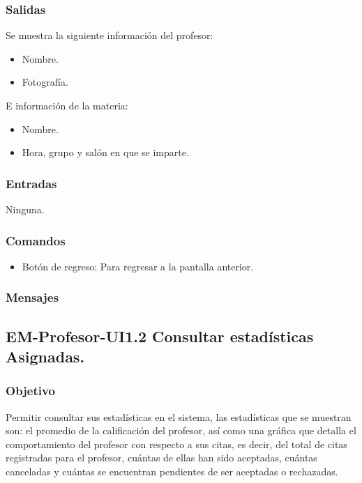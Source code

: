 \pagebreak
{}

\subsubsection{Salidas}
	Se muestra la siguiente información del profesor:
	\begin{itemize}
		\item Nombre.
		\item Fotografía. 
	\end{itemize}
	E información de la materia:
	\begin{itemize}
		\item Nombre.
		\item Hora, grupo y salón en que se imparte. 
	\end{itemize}

\subsubsection{Entradas}
	\noindent
	Ninguna.

\subsubsection{Comandos}
\begin{itemize}
	\item Botón de regreso: Para regresar a la pantalla anterior.
\end{itemize}

\subsubsection{Mensajes}
	\noindent 

\subsection{EM-Profesor-UI1.2 Consultar estadísticas Asignadas.}

\subsubsection{Objetivo}
	\noindent
	Permitir consultar sus estadísticas en el sistema, las estadísticas que se muestran son: el promedio de la calificación del profesor, así como una gráfica que detalla el comportamiento del profesor con respecto a sus citas, es decir, del total de citas registradas para el profesor, cuántas de ellas han sido aceptadas, cuántas canceladas y cuántas se encuentran pendientes de ser aceptadas o rechazadas. 

